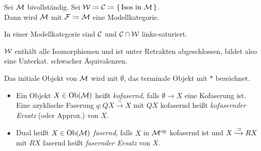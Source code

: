 \documentclass{cheat-sheet}
\newenvironment{centertikzcd}
  {\begin{center}\begin{tikzcd}}
  {\end{tikzcd}\end{center}}
\begin{document}
\begin{bsp}
  Sei $\mathcal{M}$ bivollständig. Sei $\mathcal{W} \coloneqq \mathcal{C} \coloneqq \{ \, \text{Isos in $\mathcal{M}$} \, \}$. \\
  Dann wird $\mathcal{M}$ mit $\mathcal{F} \coloneqq \mathcal{M}$ eine Modellkategorie.
\end{bsp}

\begin{prop}
  In einer Modellkategorie sind $\mathcal{C}$ und $\mathcal{C} \cap \mathcal{W}$ links-saturiert.
\end{prop}

\begin{lem}
  $\mathcal{W}$ enthält alle Isomorphismen und ist unter Retrakten abgeschlossen, bildet also eine Unterkat. schwacher Äquivalenzen.
\end{lem}

\begin{nota}
  Das initiale Objekt von $\mathcal{M}$ wird mit $\emptyset$, das terminale Objekt mit $*$ bezeichnet.
\end{nota}

\begin{defn}
  \begin{itemize}
    \item Ein Objekt $X \in \operatorname{Ob}(\mathcal{M})$ heißt \emph{kofasernd}, falls $\emptyset \to X$ eine Kofaserung ist.
    Eine azyklische Faserung $q : QX \xrightarrow{{\sim}} X$ mit $QX$ kofasernd heißt \emph{kofasernder Ersatz} (oder Approx.) von $X$. \\
    \item Dual heißt $X \in \operatorname{Ob}(\mathcal{M})$ \emph{fasernd}, falls $X$ in $\mathcal{M}^{\mathrm{op}}$ kofasernd ist und $X \xhookrightarrow{{\simeq}} RX$ mit $RX$ fasernd heißt \emph{fasernder Ersatz} von $X$.
  \end{itemize}
\end{defn}

\end{document}
